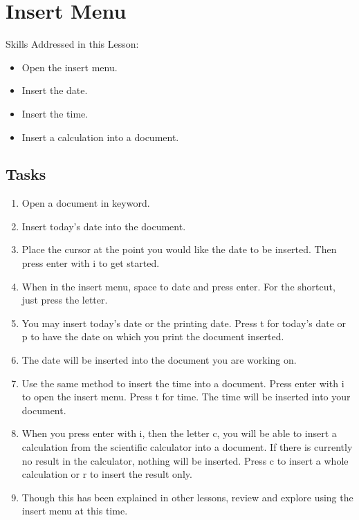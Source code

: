 \documentclass[10pt,letterpaper,twoside]{report}
\begin{document}
{{{%
\clearpage

\section{ Insert Menu}

Skills Addressed in this Lesson:
\begin{itemize}
	\item Open the insert menu.
	\item Insert the date.
	\item Insert the time.
	\item Insert a calculation into a document.
\end{itemize}

\subsection{Tasks}
\begin{enumerate}
	\item Open a document in keyword.
	\item Insert today's date into the document.
	\item Place the cursor at the point you would like the date to be inserted. Then press enter with i to get started.
	\item When in the insert menu, space to date and press enter. For the shortcut, just press the letter.
	\item You may insert today's date or the printing date. Press t for today's date or p to have the date on which you print the document inserted.
	\item The date will be inserted into the document you are working on.
	\item Use the same method to insert the time into a document. Press enter with i to open the insert menu. Press t for time. The time will be inserted into your document.
	\item When you press enter with i, then the letter c, you will be able to insert a calculation from the scientific calculator into a document. If there is currently no result in the calculator, nothing will be inserted. Press c to insert a whole calculation or r to insert the result only.
	\item Though this has been explained in other lessons, review and explore using the insert menu at this time.
\end{enumerate}
}}}
\end{document}
